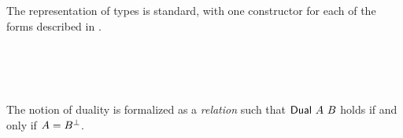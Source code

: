 The representation of types is standard, with one constructor for each of the
forms described in .

\begin{code}%
\>[0]\AgdaSpace{}%
\AgdaSpace{}%
\AgdaSymbol{:}\AgdaSpace{}%
\AgdaSpace{}%
\<%
\\
\>[0][@{}l@{\AgdaIndent{0}}]%
\>[2]\AgdaSpace{}%
\AgdaSpace{}%
\AgdaSpace{}%
%
\>[19]\AgdaSymbol{:}\AgdaSpace{}%
\<%
\\
%
\>[2]\AgdaSpace{}%
%
\>[19]\AgdaSymbol{:}\AgdaSpace{}%
\AgdaSpace{}%
\AgdaSpace{}%
\<%
\\
%
\>[2]\AgdaOperator{\AgdaInductiveConstructor{\AgdaUnderscore{}\&\AgdaUnderscore{}}}\AgdaSpace{}%
\AgdaSpace{}%
\AgdaSpace{}%
%
\>[19]\AgdaSymbol{:}\AgdaSpace{}%
\AgdaSpace{}%
\AgdaSpace{}%
\AgdaSpace{}%
\AgdaSpace{}%
\<%
\end{code}

The notion of duality is formalized as a \emph{relation} 
such that $\AgdaDatatype{Dual}~A~B$ holds if and only if $A = B^{\bot}$.

